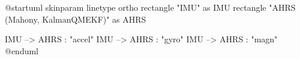 \documentclass[11pt,letterpaper]{article}
\begin{document}
\begin{plantuml}
@startuml
skinparam linetype ortho
rectangle "IMU" as IMU
rectangle "AHRS (Mahony, KalmanQMEKF)" as AHRS

IMU --> AHRS : "accel"
IMU --> AHRS : "gyro"
IMU --> AHRS : "magn"
@enduml
\end{plantuml}
\end{document}
